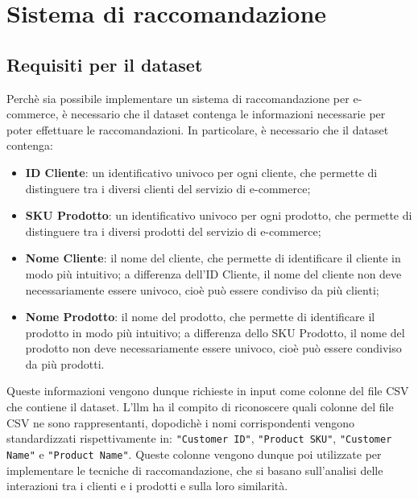 \chapter{Sistema di raccomandazione}
\label{cap:sistema-raccomandazione}


\section{Requisiti per il dataset}

Perchè sia possibile implementare un sistema di raccomandazione per e-commerce, è necessario che il dataset contenga le informazioni necessarie per poter effettuare le raccomandazioni. In particolare, è necessario che il dataset contenga:
\begin{itemize}
    \item \textbf{ID Cliente}: un identificativo univoco per ogni cliente, che permette di distinguere tra i diversi clienti del servizio di e-commerce;
    \item \textbf{SKU Prodotto}: un identificativo univoco per ogni prodotto, che permette di distinguere tra i diversi prodotti del servizio di e-commerce;
    \item \textbf{Nome Cliente}: il nome del cliente, che permette di identificare il cliente in modo più intuitivo; a differenza dell'ID Cliente, il nome del cliente non deve necessariamente essere univoco, cioè può essere condiviso da più clienti;
    \item \textbf{Nome Prodotto}: il nome del prodotto, che permette di identificare il prodotto in modo più intuitivo; a differenza dello SKU Prodotto, il nome del prodotto non deve necessariamente essere univoco, cioè può essere condiviso da più prodotti.
\end{itemize}

Queste informazioni vengono dunque richieste in input come colonne del file CSV che contiene il dataset. L'\gls{llm} ha il compito di riconoscere quali colonne del file CSV ne sono rappresentanti, dopodichè i nomi corrispondenti vengono standardizzati rispettivamente in: \texttt{"Customer ID"}, \texttt{"Product SKU"}, \texttt{"Customer Name"} e \texttt{"Product Name"}. Queste colonne vengono dunque poi utilizzate per implementare le tecniche di raccomandazione, che si basano sull'analisi delle interazioni tra i clienti e i prodotti e sulla loro similarità.


